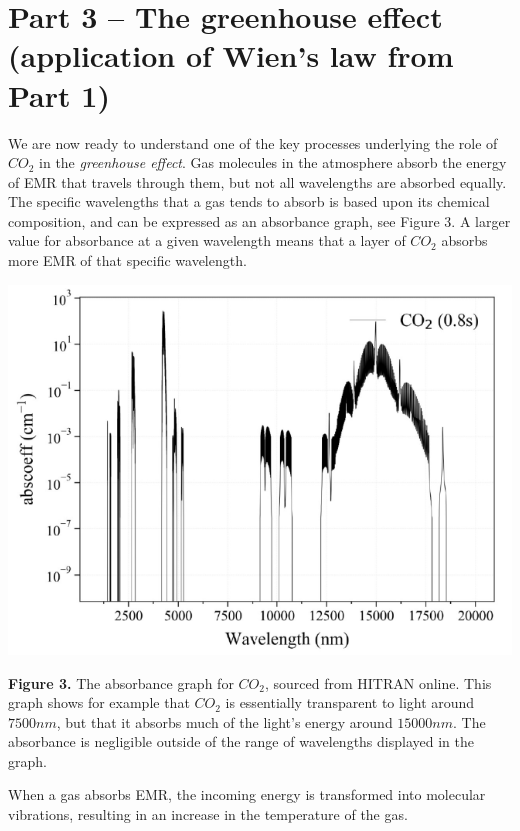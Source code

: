 \documentclass{exam}
\begin{document}
\section*{Part 3 -- The greenhouse effect (application of Wien's law from Part 1)}
We are now ready to understand one of the key processes underlying the role of $CO_2$ in the \emph{greenhouse effect}.
Gas molecules in the atmosphere absorb the energy of EMR that travels through them, but not all wavelengths are absorbed equally. The specific wavelengths that a gas tends to absorb is based upon its chemical composition, and can be expressed as an absorbance graph, see Figure 3. A larger value for absorbance at a given wavelength means that a layer of $CO_2$ absorbs more EMR of that specific wavelength.
\begin{center}
        \includegraphics[scale=0.6]{image.png}
        
        \textbf{Figure 3.} The absorbance graph for $CO_2$, sourced from HITRAN online. This graph shows for example that $CO_2$ is essentially transparent to light around $7500nm$, but that it absorbs much of the light's energy around $15000nm$. The absorbance is negligible outside of the range of wavelengths displayed in the graph.
    \end{center}

    \noindent When a gas absorbs EMR, the incoming energy is transformed into molecular vibrations, resulting in an increase in the temperature of the gas.
\end{document}
